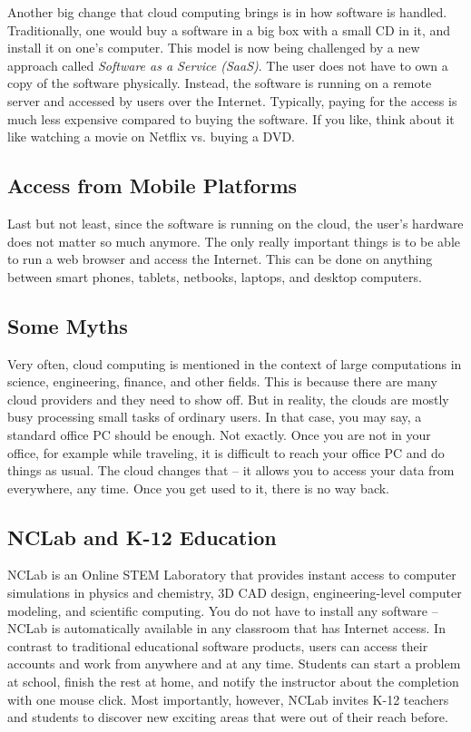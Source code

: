 \documentclass[article,A4,12pt]{llncs}
\begin{document}
Another big change that cloud computing brings is in how software is handled. 
Traditionally, one would buy a software in a big box with a small CD in it, 
and install it on one's computer. This model is now being challenged by a new 
approach called {\em Software as a Service (SaaS)}. The user does not have 
to own a copy of the software physically. Instead, the software is running 
on a remote server and accessed by users over the Internet. Typically, paying 
for the access is much less expensive compared to buying the software. If you like,
think about it like watching a movie on Netflix vs. buying a DVD. 

\subsection{Access from Mobile Platforms}

Last but not least, since the software is running on the cloud, the user's hardware 
does not matter so much anymore. The only really important things is to be able to 
run a web browser and access the Internet. This can be done on anything between smart 
phones, tablets, netbooks, laptops, and desktop computers. 

\subsection{Some Myths}

Very often, cloud computing is mentioned in the context of large 
computations in science, engineering, finance, and other fields. This is because there are many 
cloud providers and they need to show off. But in reality, the clouds are mostly
busy processing small tasks of ordinary users. In that case, you may say, a standard 
office PC should be enough. Not exactly. Once you are not in your office, for example
while traveling, it is difficult to reach your office PC and do things as usual. 
The cloud changes that -- it allows you to access your data 
from everywhere, any time. Once you get used to it, there is no way back. 

\subsection{NCLab and K-12 Education}

NCLab is an Online STEM Laboratory that provides 
instant access to computer simulations in physics and chemistry, 3D CAD design, 
engineering-level computer modeling, and scientific computing. You do not have 
to install any software -- NCLab is automatically available in any classroom that 
has Internet access. In contrast to traditional educational software products, 
users can access their accounts and work from anywhere and at any time.
Students can start a problem at school, finish the rest at home, and notify 
the instructor about the completion with one mouse click. Most importantly, 
however, NCLab invites K-12 teachers and students to discover new exciting 
areas that were out of their reach before.
\end{document}
